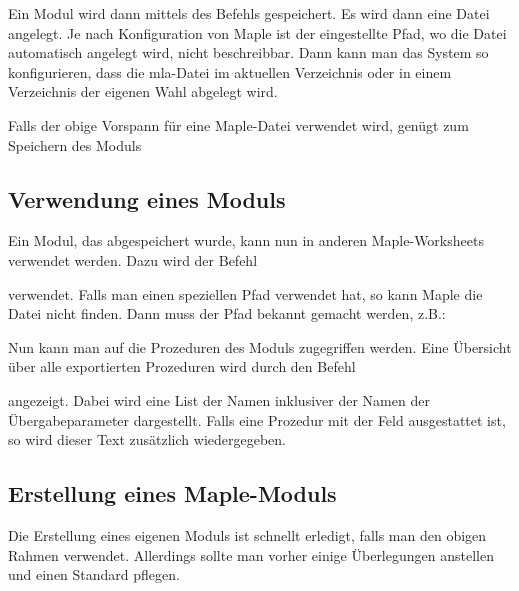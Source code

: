 \bigskip

Ein Modul wird dann mittels des Befehls  gespeichert. Es wird dann eine Datei  angelegt. Je nach Konfiguration von Maple ist der eingestellte Pfad, wo die Datei automatisch angelegt wird, nicht beschreibbar. Dann kann man das System so konfigurieren, dass die mla-Datei im aktuellen Verzeichnis oder in einem Verzeichnis der eigenen Wahl abgelegt wird. 

\bigskip

Falls der obige Vorspann für eine Maple-Datei verwendet wird, genügt zum Speichern des Moduls



\subsection{Verwendung eines Moduls}


Ein Modul, das abgespeichert wurde, kann nun in anderen Maple-Worksheets verwendet werden. Dazu wird der Befehl


verwendet. Falls man einen speziellen Pfad verwendet hat, so kann Maple die Datei  nicht finden. Dann muss der Pfad bekannt gemacht werden, z.B.:


Nun kann man auf die Prozeduren des Moduls zugegriffen werden. Eine Übersicht über alle exportierten Prozeduren wird durch den Befehl


angezeigt. Dabei wird eine List der Namen inklusiver der Namen der Übergabeparameter dargestellt. Falls eine Prozedur mit der Feld  ausgestattet ist, so wird dieser Text zusätzlich wiedergegeben.


\subsection{Erstellung eines Maple-Moduls}

Die Erstellung eines eigenen Moduls ist schnellt erledigt, falls man den obigen Rahmen verwendet. Allerdings sollte man vorher einige Überlegungen anstellen und einen Standard pflegen. 

\bigskip

